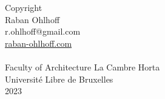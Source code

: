 \documentclass[a4paper, 12pt]{report}
\begin{document}
\newpage
\vspace*{\fill}
\begin{flushright}
Copyright \textcopyright\\
Raban Ohlhoff\\
r.ohlhoff@gmail.com\\
\href{https://raban-ohlhoff.com}{raban-ohlhoff.com}\\~\\

Faculty of Architecture La Cambre Horta \\
Université Libre de Bruxelles \\
2023\\
\end{flushright}
\thispagestyle{empty}
\clearpage

\clearpage
\newpage \ \thispagestyle{empty}
\newpage\clearpage
\end{document}
